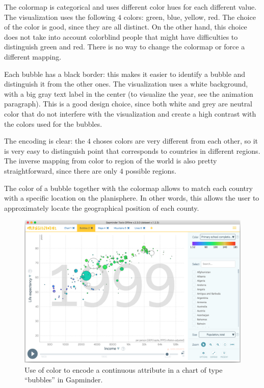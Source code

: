 The colormap is categorical and uses different color hues for each different value.
The visualization uses the following $4$ colors: green, blue, yellow, red.
The choice of the color is good, since they are all distinct.
On the other hand, this choice does not take into account colorblind people that might have difficulties to distinguish green and red.
There is no way to change the colormap or force a different mapping.

Each bubble has a black border:
this makes it easier to identify a bubble and distinguish it from the other ones.
The visualization uses a white background, with a big gray text label in the center (to visualize the year, see the animation paragraph).
This is a good design choice, since both white and grey are neutral color that do not interfere with the visualization and create a high contrast with the colors used for the bubbles.

The encoding is clear: the $4$ choses colors are very different from each other, so it is very easy to distinguish point that corresponds to countries in different regions.
The inverse mapping from color to region of the world is also pretty straightforward, since there are only $4$ possible regions.

The color of a bubble together with the colormap allows to match each country with a specific location on the planisphere.
In other words, this allows the user to approximately locate the geographical position of each county.

\begin{figure}[h]
	\centering
	\includegraphics[width=0.95\columnwidth]{figures/bubbles-continuous-color}
	\caption{Use of color to encode a continuous attribute in a chart of type ``bubbles'' in Gapminder.}
	\label{fig:bubbles-continuous-color}
\end{figure}

